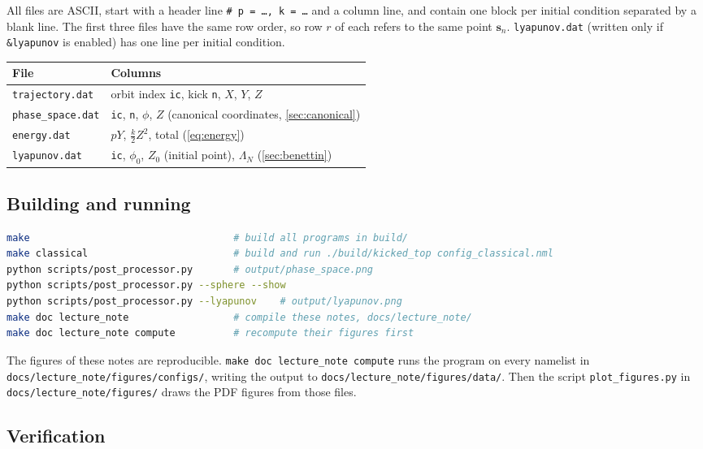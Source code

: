 \documentclass[11pt,a4paper]{article}
\newcommand{\vs}{\bm{s}}
\begin{document}
All files are ASCII, start with a header line \texttt{\# p = \dots, k = \dots} and a column line, and contain one
block per initial condition separated by a blank line. The first three files have the same row order, so row $r$ of
each refers to the same point $\vs_n$. \texttt{lyapunov.dat} (written only if \texttt{\&lyapunov} is enabled) has one line
per initial condition.
\begin{center}
\small
\begin{tabular}{ll}
  \toprule
  File & Columns \\
  \midrule
  \texttt{trajectory.dat} & orbit index \texttt{ic}, kick \texttt{n}, $X$, $Y$, $Z$ \\
  \texttt{phase\_space.dat} & \texttt{ic}, \texttt{n}, $\phi$, $Z$ \quad (canonical coordinates, \cref{sec:canonical}) \\
  \texttt{energy.dat} & $pY$, $\frac k2 Z^2$, total \quad (\cref{eq:energy}) \\
  \texttt{lyapunov.dat} & \texttt{ic}, $\phi_0$, $Z_0$ (initial point), $\Lambda_N$ \quad (\cref{sec:benettin}) \\
  \bottomrule
\end{tabular}
\end{center}

\subsection{Building and running}

\begin{lstlisting}[language=bash, numbers=none]
make                                   # build all programs in build/
make classical                         # build and run ./build/kicked_top config_classical.nml
python scripts/post_processor.py       # output/phase_space.png
python scripts/post_processor.py --sphere --show
python scripts/post_processor.py --lyapunov    # output/lyapunov.png
make doc lecture_note                  # compile these notes, docs/lecture_note/
make doc lecture_note compute          # recompute their figures first
\end{lstlisting}
The figures of these notes are reproducible. \texttt{make doc lecture\_note compute} runs the program on every
namelist in \texttt{docs/lecture\_note/figures/configs/}, writing the output to
\texttt{docs/lecture\_note/figures/data/}. Then the script \texttt{plot\_figures.py} in
\texttt{docs/lecture\_note/figures/} draws the PDF figures from those files.

\subsection{Verification}
\end{document}
